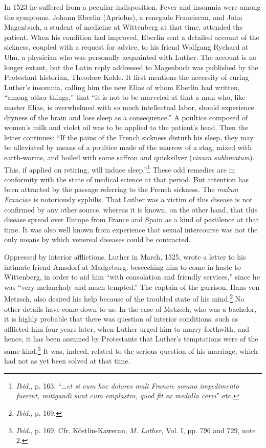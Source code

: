 In 1523 he suffered from a peculiar indisposition. Fever and insomnia
were among the symptoms. Johann Eberlin (Apriolus), a
renegade Franciscan, and John Magenbuch, a student of medicine at
Wittenberg at that time, attended the patient. When his condition
had improved, Eberlin sent a detailed account of the sickness, coupled
with a request for advice, to his friend Wolfgang Rychard at Ulm,
a physician who was personally acquainted with Luther. The account
is no longer extant, but the Latin reply addressed to Magenbuch was
published by the Protestant historian, Theodore Kolde. It first mentions
the necessity of curing Luther’s insomnia, calling him the new
Elias of whom Eberlin had written, “among other things,” that “it
is not to be marveled at that a man who, like master Elias, is overwhelmed
with so much intellectual labor, should experience dryness
of the brain and lose sleep as a consequence.” A poultice composed of
women’s milk and violet oil was to be applied to the patient’s head.
Then the letter continues: “If the pains of the French sickness disturb
his sleep, they may be alleviated by means of a poultice made of
the marrow of a stag, mixed with earth-worms, and boiled with some
saffron and quicksilver (\textit{vinum sublimatum}). This, if applied on retiring,
will induce sleep.”\footnote
{\textit{Ibid.}, p. 163: ``\textit{\dots et si cum hoc dolores mali Francie somno impedimento fuerint,
mitigandi sunt cum emplastro, quod fit ex medulla cervi}'' etc.}
These odd remedies are in conformity with
the state of medical science at that period. But attention has been attracted
by the passage referring to the French sickness. The \textit{malum
Franciae} is notoriously syphilis. That Luther was a victim of this disease
is not confirmed by any other source, whereas it is known, on the
other hand, that this disease spread over Europe from France and
Spain as a kind of pestilence at that time. It was also well known from
experience that sexual intercourse was not the only means by which
venereal diseases could be contracted.

Oppressed by interior afflictions, Luther in March, 1525, wrote a
letter to his intimate friend Amsdorf at Madgeburg, beseeching him
to come in haste to Wittenberg, in order to aid him “with consolation
and friendly services,” since he was “very melancholy and much
tempted.” The captain of the garrison, Hans von Metzsch, also desired
his help because of the troubled state of his mind.\footnote{\textit{Ibid.}, p. 169.}
No other
details have come down to us. In the case of Metzsch, who was a
bachelor, it is highly probable that there was question of interior
conditions, such as afflicted him four years later, when Luther urged
him to marry forthwith, and hence, it has been assumed by Protestants
that Luther’s temptations were of the same kind.\footnote
{\textit{Ibid.}, p. 169. Cfr. Köstlin-Kawerau, \textit{M. Luther}, Vol. I, pp. 796 and 729, note 2.}
It was, indeed, related
to the serious question of his marriage, which had not
as yet been solved at that time.

